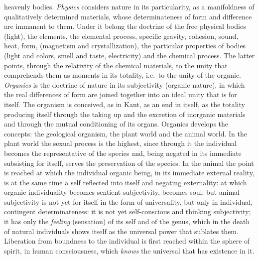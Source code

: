 heavenly bodies. \emph{Physics} considers nature in its particularity,
as a manifoldness of qualitatively determined materials, whose
determinateness of form and difference are immanent to them. Under it
belong the doctrine of the free physical bodies (light), the elements,
the elemental process, specific gravity, cohesion, sound, heat, form,
(magnetism and crystallization), the particular properties of bodies
(light and colors, smell and taste, electricity) and the chemical
process. The latter points, through the relativity of the chemical
materials, to the unity that comprehends them as moments in its
totality, i.e.\ to the unity of the organic. \emph{Organics}
is the doctrine of nature in its subjectivity (organic nature), in
which the real differences of form are joined together into an ideal
unity that is for itself. The organism is conceived, as in Kant, as an
end in itself, as the totality producing itself through the taking up
and the excretion of inorganic materials and through the mutual
conditioning of its organs. Organics develops the concepts: the
geological organism, the plant world and the animal world. In the plant
world the sexual process is the highest, since through it the
individual becomes the representative of the species and, being negated
in its immediate subsisting for itself, serves the preservation of the
species. In the animal the point is reached at which the individual
organic being, in its immediate external reality, is at the same time a
self reflected into itself and negating externality: at which organic
individuality becomes sentient subjectivity, becomes soul; but animal
subjectivity is not yet for itself in the form of universality, but only
in individual, contingent determinateness: it is not yet self-conscious
and thinking subjectivity; it has only the \emph{feeling} (sensation) of
its self and of the genus, which in the death of natural individuals
shows itself as the universal power that sublates them. Liberation from
boundness to the individual is first reached within the sphere of
spirit, in human consciousness, which \emph{knows} the universal that
has existence in it.

